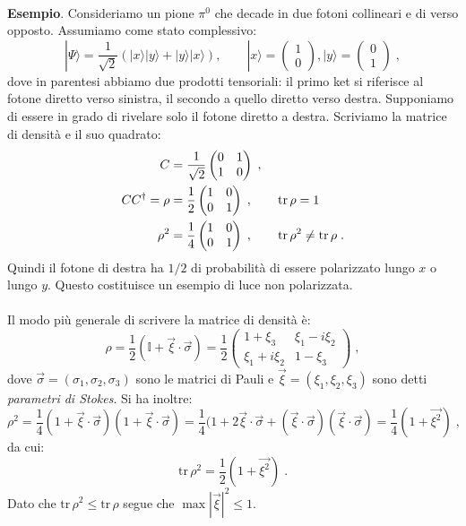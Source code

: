 \documentclass[12pt,a4paper]{report}
\theoremstyle{definition}
\numberwithin{equation}{section}
\newcommand{\ket}{\rangle}
\newcommand{\adj}[1]{#1^{\dagger}}
\newcommand{\tr}{\mathrm{tr}}
\begin{document}
\\
\textbf{Esempio}. Consideriamo un pione $\pi^0$ che decade in due fotoni collineari e di verso opposto. Assumiamo come stato complessivo:
\begin{equation}
|\Psi\ket=\frac{1}{\sqrt{2}}(|x\ket|y\ket+|y\ket|x\ket), \qquad |x\ket=\left(\begin{matrix}
1 \\
0
\end{matrix}\right), |y\ket=\left(\begin{matrix}
0 \\
1
\end{matrix}\right)\;,
\end{equation}
dove in parentesi abbiamo due prodotti tensoriali: il primo ket si riferisce al fotone diretto verso sinistra, il secondo a quello diretto verso destra. Supponiamo di essere in grado di rivelare solo il fotone diretto a destra. Scriviamo la matrice di densità e il suo quadrato:
\begin{align}
C&=\frac{1}{\sqrt{2}}\left(\begin{matrix}
0 & 1 \\
1 & 0
\end{matrix}\right)\;, \notag \\
C\adj{C}=\rho&=\frac{1}{2}\left(\begin{matrix}
1 & 0 \\
0 & 1
\end{matrix}\right)\;, \qquad \tr\,\rho=1 \notag \\
\rho^2&=\frac{1}{4}\left(\begin{matrix}
1 & 0 \\
0 & 1
\end{matrix}\right)\;, \qquad \tr\,\rho^2\ne \tr\,\rho\;.
\end{align}
Quindi il fotone di destra ha $1/2$ di probabilità di essere polarizzato lungo $x$ o lungo $y$. Questo costituisce un esempio di luce non polarizzata. \\
\\
Il modo più generale di scrivere la matrice di densità è:
\begin{equation}
\rho=\frac{1}{2}\left(\mathbb{I}+\vec{\xi}\cdot\vec{\sigma}\right)=\frac{1}{2}\left(\begin{matrix}
1+\xi_3 & \xi_1-i\xi_2 \\
\xi_1+i\xi_2 & 1-\xi_3
\end{matrix}\right)\;,
\end{equation}
dove $\vec{\sigma}=(\sigma_1,\sigma_2,\sigma_3)$ sono le matrici di Pauli e $\vec{\xi}=(\xi_1,\xi_2,\xi_3)$ sono detti \textit{parametri di Stokes}. Si ha inoltre:
\begin{equation}
\rho^2=\frac{1}{4}(1+\vec{\xi}\cdot\vec{\sigma})(1+\vec{\xi}\cdot\vec{\sigma})=\frac{1}{4}(1+2\vec{\xi}\cdot\vec{\sigma}+(\vec{\xi}\cdot\vec{\sigma})(\vec{\xi}\cdot\vec{\sigma})=\frac{1}{4}(1+\vec{\xi^2})\;,
\end{equation}
da cui:
\begin{equation}
\tr\,\rho^2=\frac{1}{2}(1+\vec{\xi^2})\;.
\end{equation}
Dato che $\tr\,\rho^2\le\tr\,\rho$ segue che $\max|\vec{\xi}|^2\le 1$.
\end{document}
